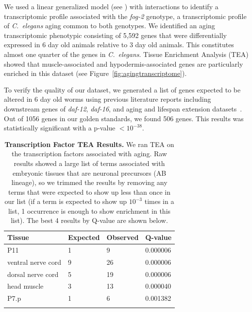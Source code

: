 \documentclass[9pt,twocolumn,twoside]{gsag3jnl}
\newcommand{\cel}{\emph{C.~elegans}}
\newcommand{\fog}{\emph{fog-2}}
\newcommand{\agen}{5,592}
\newcommand{\goldn}{1056}
\newcommand{\goldfound}{506}
\newcommand{\goldpval}{$<10^{-38}$}
\begin{document}
We used a linear generalized model (see ) with interactions to identify a transcriptomic profile associated with the \fog{} genotype, a transcriptomic profile of \cel{} aging common to both genotypes. We identified an aging transcriptomic phenotypic consisting of \agen{} genes that were differentially expressed in 6 day old animals relative to 3 day old animals. This constitutes almost one quarter of the genes in \cel{}. Tissue Enrichment Analysis (TEA) showed that muscle-associated and hypodermis-associated genes are particularly enriched in this dataset (see Figure~\ref{fig:agingtranscriptome}).

To verify the quality of our dataset, we generated a list of genes expected to be altered in 6 day old worms using previous literature reports including downstream genes of \emph{daf-12}, \emph{daf-16}, and aging and lifespan extension datasets~\citep{}. Out of \goldn{} genes in our golden standards, we found \goldfound{} genes. This results was statistically significant with a p-value \goldpval{}.

\begin{table}[htbp]
\renewcommand{\familydefault}{\sfdefault}\normalfont{}
\centering
\caption{\textbf{Transcription Factor TEA Results.} We ran TEA on the transcription factors associated with aging. Raw results showed a large list of terms associated with embryonic tissues that are neuronal precursors (AB lineage), so we trimmed the results by removing any terms that were expected to show up less than once in our list (if a term is expected to show up $10^{-3}$ times in a list, 1 occurrence is enough to show enrichment in this list). The best 4 results by Q-value are shown below.}
\begin{tableminipage}{\textwidth}
\begin{tabularx}{\textwidth}{XXXX}
\toprule
\header{}Tissue & Expected & Observed & Q-value \\
\bottomrule{}
P11	& 1 & 9 & 0.000006\\
ventral nerve cord &	9 &	26 &	0.000006\\
dorsal nerve cord &	5 &	19 & 0.000006\\
head muscle	& 3	& 13 &	0.000040\\
P7.p & 1 &	6	& 0.001382\\
\bottomrule{}
\end{tabularx}
\label{tab:tea_tf_age}
\end{tableminipage}
\end{table}
\end{document}
